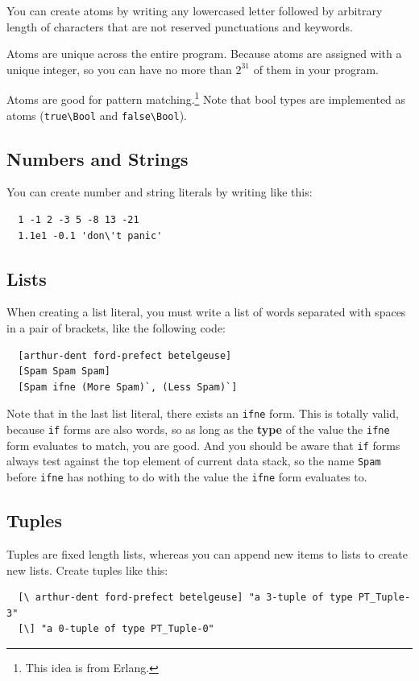\documentclass{book}
\begin{document}
You can create atoms by writing any lowercased letter followed by arbitrary length of characters that are not reserved punctuations and keywords.

Atoms are unique across the entire program. Because atoms are assigned with a unique integer, so you can have no more than $2^{31}$ of them in your program.


Atoms are good for pattern matching.\footnote{This idea is from Erlang.} Note that bool types are implemented as atoms (\texttt{true\textbackslash Bool} and \texttt{false\textbackslash Bool}).

\subsection{Numbers and Strings}

You can create number and string literals by writing like this:
\begin{verbatim}
  1 -1 2 -3 5 -8 13 -21
  1.1e1 -0.1 'don\'t panic'
\end{verbatim}

\subsection{Lists}

When creating a list literal, you must write a list of words separated with spaces in a pair of brackets, like the following code:
\begin{verbatim}
  [arthur-dent ford-prefect betelgeuse]
  [Spam Spam Spam]
  [Spam ifne (More Spam)`, (Less Spam)`]
\end{verbatim}

Note that in the last list literal, there exists an \texttt{ifne} form. This
is totally valid, because \texttt{if} forms are also words, so as long as the \textbf{type} of the value the \texttt{ifne} form evaluates to match, you are good. And you should be aware that \texttt{if} forms always test against the top element of current data stack, so the name \texttt{Spam} before \texttt{ifne} has nothing to do with the value the \texttt{ifne} form evaluates to.

\subsection{Tuples}

Tuples are fixed length lists, whereas you can append new items to lists to create new lists. Create tuples like this:
\begin{verbatim}
  [\ arthur-dent ford-prefect betelgeuse] "a 3-tuple of type PT_Tuple-3"
  [\] "a 0-tuple of type PT_Tuple-0"
\end{verbatim}
\end{document}
